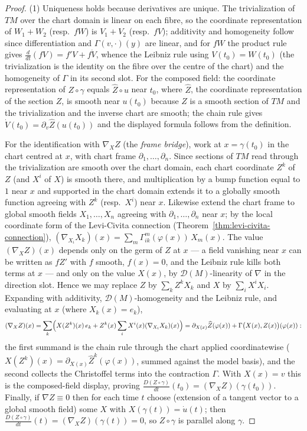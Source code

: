 \begin{proof}
\leanok
{}
(1) Uniqueness holds because derivatives are unique. The trivialization of
$TM$ over the chart domain is linear on each fibre, so the coordinate
representation of $W_1+W_2$ (resp.\ $fW$) is $V_1+V_2$ (resp.\ $fV$);
additivity and homogeneity follow since differentiation and
$\Gamma(v,\cdot)(y)$ are linear, and for $fW$ the product rule gives
$\frac{d}{dt}(fV)=f'V+f\dot V$, whence the Leibniz rule using
$V(t_0)=W(t_0)$ (the trivialization is the identity on the fibre over the
centre of the chart) and the homogeneity of $\Gamma$ in its second slot.
For the composed field: the coordinate representation of $Z\circ\gamma$
equals $\widehat Z\circ u$ near $t_0$, where $\widehat Z$, the coordinate
representation of the section $Z$, is smooth near $u(t_0)$ because $Z$ is a
smooth section of $TM$ and the trivialization and the inverse chart are
smooth; the chain rule gives $\dot V(t_0)=\partial_v\widehat Z(u(t_0))$ and
the displayed formula follows from the definition.

For the identification with $\nabla_XZ$ (the \emph{frame bridge}), work at
$x=\gamma(t_0)$ in the chart centred at $x$, with chart frame
$\partial_1,\dots,\partial_n$. Since sections of $TM$ read through the
trivialization are smooth over the chart domain, each chart coordinate
$Z^k$ of $Z$ (and $X^i$ of $X$) is smooth there, and multiplication by a
bump function equal to $1$ near $x$ and supported in the chart domain
extends it to a globally smooth function agreeing with $Z^k$ (resp.\
$X^i$) near $x$. Likewise extend the chart frame to global smooth fields
$X_1,\dots,X_n$ agreeing with $\partial_1,\dots,\partial_n$ near $x$; by
the local coordinate form of the Levi-Civita connection
(Theorem~\ref{thm:levi-civita-connection}),
$(\nabla_{X_i}X_k)(x)=\sum_m\Gamma^m_{ik}(\varphi(x))\,X_m(x)$. The value
$(\nabla_XZ)(x)$ depends only on the germ of $Z$ at $x$ — a field
vanishing near $x$ can be written as $fZ'$ with $f$ smooth, $f(x)=0$, and
the Leibniz rule kills both terms at $x$ — and only on the value $X(x)$,
by $\mathcal D(M)$-linearity of $\nabla$ in the direction slot. Hence we
may replace $Z$ by $\sum_kZ^kX_k$ and $X$ by $\sum_iX^iX_i$. Expanding
with additivity, $\mathcal D(M)$-homogeneity and the Leibniz rule, and
evaluating at $x$ (where $X_k(x)=e_k$),
$$(\nabla_XZ)(x)
=\sum_k\Bigl(X(Z^k)(x)\,e_k+Z^k(x)\sum_iX^i(x)(\nabla_{X_i}X_k)(x)\Bigr)
=\partial_{X(x)}\widehat Z(\varphi(x))
+\Gamma\bigl(X(x),Z(x)\bigr)(\varphi(x)):$$
the first summand is the chain rule through the chart applied
coordinatewise ($X(Z^k)(x)=\partial_{X(x)}\widehat Z^k(\varphi(x))$,
summed against the model basis), and the second collects the Christoffel
terms into the contraction $\Gamma$. With $X(x)=v$ this is the
composed-field display, proving
$\frac{D(Z\circ\gamma)}{dt}(t_0)=(\nabla_XZ)(\gamma(t_0))$. Finally, if
$\nabla Z\equiv0$ then for each time $t$ choose (extension of a tangent
vector to a global smooth field) some $X$ with $X(\gamma(t))=\dot u(t)$;
then $\frac{D(Z\circ\gamma)}{dt}(t)=(\nabla_XZ)(\gamma(t))=0$, so
$Z\circ\gamma$ is parallel along $\gamma$.


\end{proof}
